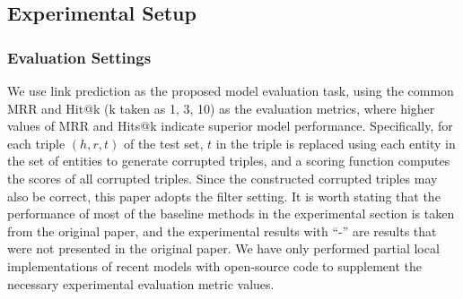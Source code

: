 \documentclass[letterpaper]{article} %
\begin{document}
\subsection{Experimental Setup}
\subsubsection{Evaluation Settings}
We use link prediction as the proposed model evaluation task, using the common MRR and Hit@k (k taken as 1, 3, 10) as the evaluation metrics, where higher values of MRR and Hits@k indicate superior model performance. Specifically, for each triple $(h, r, t)$ of the test set, $t$ in the triple is replaced using each entity in the set of entities to generate corrupted triples, and a scoring function computes the scores of all corrupted triples. Since the constructed corrupted triples may also be correct, this paper adopts the filter setting. It is worth stating that the performance of most of the baseline methods in the experimental section is taken from the original paper, and the experimental results with ``-'' are results that were not presented in the original paper. We have only performed partial local implementations of recent models with open-source code to supplement the necessary experimental evaluation metric values.
\end{document}
